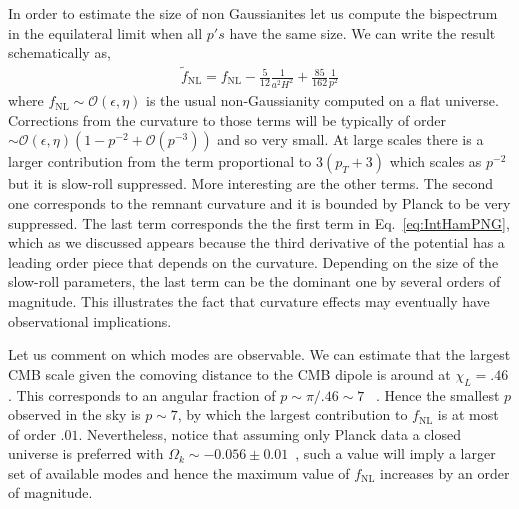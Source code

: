 \documentclass[a4paper,11pt]{article}
\numberwithin{equation}{section}
\numberwithin{equation}{section}
\begin{document}
In order to estimate the size of non Gaussianites let us compute the bispectrum in the equilateral limit when all $p's$ have  the same size. We can write the result schematically as, 
 \begin{align}
\boxed{
 \tilde{f}_{\mathrm{NL}}=f_{\mathrm{NL}} - \frac{5}{12} \frac{1}{a^2 H^2} +\frac{85}{162}\frac{1}{p^2}}
 \end{align}
where $f_{\mathrm{NL}}\sim\mathcal{O}(\epsilon,\eta)$ is the usual non-Gaussianity computed on a flat universe. Corrections from the curvature to those terms will be typically of order $\sim\mathcal{O}(\epsilon,\eta)(1-p^{-2}+\mathcal{O}(p^{-3}))$ and so very small. At large scales there is a larger contribution from the term proportional to $3(p_T+3)$ which scales as $p^{-2}$ but it is slow-roll suppressed. More interesting are the other terms. The second one corresponds to the remnant curvature and it is bounded by Planck to be very suppressed. The last term corresponds the the first term in Eq.~\eqref{eq:IntHamPNG}, which as we discussed appears because the third derivative of the potential has a leading order piece that depends on the curvature. Depending on the size of the slow-roll parameters, the last term can be the dominant one by several orders of magnitude. This illustrates the fact that curvature effects may eventually have observational implications.

Let us comment on which modes are observable. We can estimate that the largest CMB scale  given the comoving distance to the CMB dipole is around at $\chi_L=.46$. This corresponds to an angular fraction of $p\sim\pi/.46\sim 7$ ~\cite{Seery:2010kh}. Hence the smallest $p$ observed in the sky is $p\sim 7$, by which the largest contribution to $f_{\mathrm{NL}}$ is at most of order $.01$. Nevertheless, notice that assuming only Planck data a closed universe is preferred with $\Omega_k\sim -0.056\pm 0.01$~\cite{Planck:2018jri,Handley:2019tkm}, such a value will imply a larger set of available modes and hence the maximum value of  $f_{\mathrm{NL}}$ increases by an order of magnitude.
\end{document}
